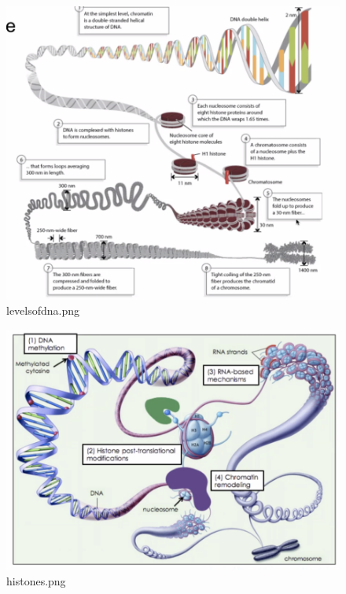 \documentclass[letterpaper]{article}
\begin{document}
\begin{figure}[htbp]
\centering
\includegraphics[width=.9\linewidth]{levelsofdna.png}
\caption{levelsofdna.png}
\end{figure}

\begin{figure}[htbp]
\centering
\includegraphics[width=.9\linewidth]{histones.png}
\caption{histones.png}
\end{figure}
\end{document}
